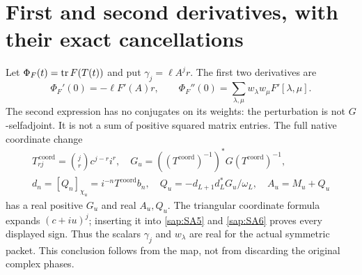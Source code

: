 \documentclass[11pt]{article}
\begin{document}
\section{First and second derivatives, with their exact cancellations}

Let $\Phi_F(t)=\operatorname{tr} F(T(t))$ and put $\gamma_j=\ell A^jr$.
The first two derivatives are
\begin{equation}\tag{SA20}\label{sap:SA20}
\Phi_F'(0)=-\ell F'(A)r,\qquad
\Phi_F''(0)=
\sum_{\lambda,\mu}w_\lambda w_\mu F'[\lambda,\mu].
\end{equation}
The second expression has no conjugates on its weights:
the perturbation is not $G$-selfadjoint. It is not a sum
of positive squared matrix entries.
The full native coordinate change
\begin{equation}\tag{SA21}\label{sap:SA21}
\begin{gathered}
T_{rj}^{\,\mathrm{coord}}=\binom jr c^{j-r}i^r,\quad
G_u=((T^{\mathrm{coord}})^{-1})^*G
                 (T^{\mathrm{coord}})^{-1},\\
d_n=[Q_n]_{\chi_u}=i^{-n}T^{\mathrm{coord}}b_n,\quad
Q_u=-d_{L+1}d_L^*G_u/\omega_L,\quad
A_u=M_u+Q_u
\end{gathered}
\end{equation}
has a real positive $G_u$ and real $A_u,Q_u$.
The triangular coordinate formula expands $(c+iu)^j$;
inserting it into \eqref{sap:SA5} and \eqref{sap:SA6} proves
every displayed sign. Thus the scalars $\gamma_j$ and
$w_\lambda$ are real for the actual symmetric packet.
This conclusion follows from the map, not from discarding
the original complex phases.
\end{document}
